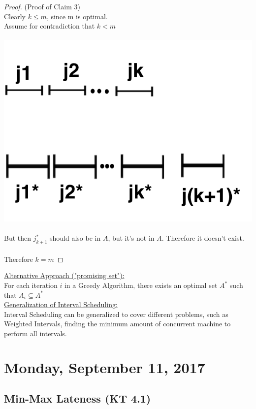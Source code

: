 \documentclass[12pt]{article}
\begin{document}
\begin{proof}(Proof of Claim 3)\\

Clearly $k\leq m$, since m is optimal.\\
Assume for contradiction that $k < m$\\
\\
\includegraphics{interval6}\\
\\
But then $j^*_{k+1}$ should also be in $A$, but it's not in $A$. Therefore it doesn't exist.\\
\\
Therefore $k=m$
\end{proof}

\underline{Alternative Approach ("promising set"):}\\
For each iteration $i$ in a Greedy Algorithm, there exists an optimal set $A^*$ such that $A_i \subseteq A^*$\\

\underline{Generalization of Interval Scheduling:}\\
Interval Scheduling can be generalized to cover different problems, such as Weighted Intervals, finding the minimum amount of concurrent machine to perform all intervals.

\newpage

\section{Monday, September 11, 2017}

\subsection{Min-Max Lateness (KT 4.1)}
\end{document}
